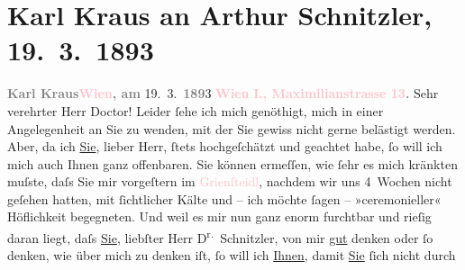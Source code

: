 

               \section[Karl Kraus an Arthur Schnitzler, 19. 3. 1893]{ Karl Kraus an Arthur Schnitzler, 19. 3. 1893}\nopagebreak{}\rehead{ }\normalsize\beginnumbering{} \toendnotes[C]{\smallbreak\pagebreak[2]} 
\toendnotes[C]{\smallbreak}\pstart
           \noindent{}{\pb}\textcolor{gray}{\textbf{Karl Kraus}}\hfill \textcolor{gray}{\textbf{\textcolor{pink}{Wien}{}\ledrightnote{\textcolor{pink}{Wien}}, am}}{ }19. 3. \textcolor{gray}{\textbf{189}}3\pend
           \pstart
           \textcolor{gray}{\textbf{\textcolor{pink}{Wien}{}\ledrightnote{\textcolor{pink}{Wien}}}}\pend
           \pstart
           \textcolor{gray}{\textbf{\textcolor{pink}{I., Maximilianstrasse 13}{}\ledrightnote{\textcolor{pink}{Mahlerstraße}}.}}\pend
           \pstart{}Sehr verehrter Herr Doctor!\pend\pstart
           Leider ſehe ich mich genöthigt, mich in einer Angelegenheit an Sie zu wenden, mit
                    der Sie gewiss nicht gerne belästigt werden. Aber, da ich \uline{Sie}, lieber Herr, ſtets hochgeſchätzt und geachtet habe, ſo will
                    ich \introOben{}mich\introOben{} auch Ihnen  ganz
                    offenbaren. Sie können ermeſſen, wie ſehr es mich kränkten muſste, daſs Sie mir
                    vorgeſtern im \textcolor{pink}{Grienſteidl}{}\ledrightnote{\textcolor{pink}{Café Griensteidl}}, nachdem wir uns
                    4 Wochen nicht geſehen hatten, mit ſichtlicher Kälte und – ich möchte ſagen –
                    »ceremonieller« Höflichkeit begegneten.\pend
           \pstart
           Und weil es mir nun ganz enorm furchtbar und rieſig daran liegt, daſs \uline{Sie}, liebſter Herr D\textsuperscript{r.} Schnitzler, von mir \uline{gut} denken oder
                    ſo denken, wie über mich zu denken iſt, ſo will ich \uline{Ihnen}, damit \uline{Sie}{ }ſich \introOben{}nicht\introOben{} durch
